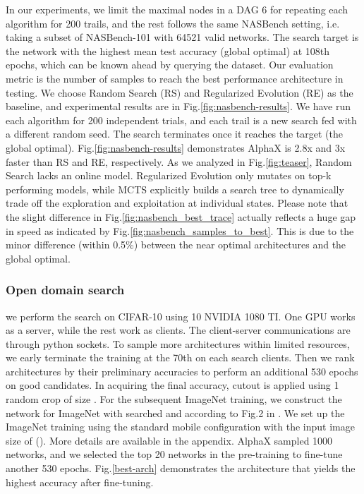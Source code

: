 \documentclass[10pt,twocolumn,letterpaper]{article}
\begin{document}
In our experiments, we limit the maximal nodes in a DAG  6 for repeating each algorithm for 200 trails, and the rest follows the same NASBench setting, i.e. taking a subset of NASBench-101 with 64521 valid networks. The search target is the network with the highest mean test accuracy (global optimal) at 108th epochs, which can be known ahead by querying the dataset. Our evaluation metric is the number of samples to reach the best performance architecture in testing. We choose Random Search (RS) \cite{sciuto2019evaluating} and Regularized Evolution (RE) \cite{real2018regularized} as the baseline, and experimental results are in 
Fig.\ref{fig:nasbench-results}. We have run each algorithm for 200 independent trials, and each trail is a new search fed with a different random seed. The search terminates once it reaches the target (the global optimal). Fig.\ref{fig:nasbench-results} demonstrates AlphaX is 2.8x and 3x faster than RS and RE, respectively. As we analyzed in Fig.\ref{fig:teaser}, Random Search lacks an online model. Regularized Evolution only mutates on top-k performing models, while MCTS explicitly builds a search tree to dynamically trade off the exploration and exploitation at individual states. Please note that the slight difference in Fig.\ref{fig:nasbench_best_trace} actually reflects a huge gap in speed as indicated by Fig.\ref{fig:nasbench_samples_to_best}. This is due to the minor difference (within 0.5\%) between the near optimal architectures and the global optimal.

\subsubsection{ Open domain search \cite{zoph2017learning}}
we perform the search on CIFAR-10 using 10 NVIDIA 1080 TI. One GPU works as a server, while the rest work as clients. The client-server communications are through python sockets. To sample more architectures within limited resources, we early terminate the training at the 70th on each search clients. Then we rank architectures by their preliminary accuracies to perform an additional 530 epochs on good candidates. In acquiring the final accuracy, cutout is applied \cite{cosine_restart} using 1 random crop of size . For the subsequent ImageNet training, we construct the network for ImageNet with searched  and  according to Fig.2 in \cite{zoph2017learning}. We set up the ImageNet training using the standard mobile configuration with the input image size of ()\cite{zoph2017learning}. More details are available in the appendix. AlphaX sampled 1000 networks, and we selected the top 20 networks in the pre-training to fine-tune another 530 epochs.  Fig.\ref{best-arch} demonstrates the architecture that yields the highest accuracy after fine-tuning.
\end{document}
